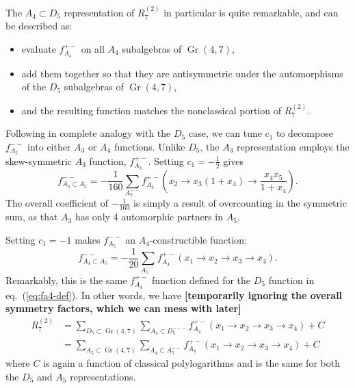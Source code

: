 \documentclass[11pt]{article}
\DeclareMathOperator{\Gr}{Gr}
\def\draftnote#1{{\bf [#1]}}
\begin{document}
The $A_4\subset D_5$ representation of $R^{(2)}_7$ in particular is quite remarkable, and can be described as: 
\begin{itemize}
	\item evaluate $f_{A_4}^{+-}$ on all $A_4$ subalgebras of $\Gr(4,7)$,
	\item add them together so that they are antisymmetric under the automorphisms of the $D_5$ subalgebras of $\Gr(4,7)$,
	\item and the resulting function matches the nonclassical portion of $R^{(2)}_7$.
\end{itemize}
Following in complete analogy with the $D_5$ case, we can tune $c_1$ to decompose $f_{A_5}^{--}$ into either $A_3$ or $A_4$ functions. Unlike $D_5$, the $A_3$ representation employs the skew-symmetric $A_3$ function, $f_{A_3}^{+-}$. Setting $c_1 = -\frac{1}{2}$ gives
\begin{equation}
	f_{A_3\subset A_5}^{--} = -\frac{1}{160}\sum_{A_5^{--}} f_{A_3}^{+-}\left(x_2\to x_3(1+x_4)\to \frac{x_4 x_5}{1+x_4}\right).
\end{equation}
The overall coefficient of $-\frac{1}{160}$ is simply a result of overcounting in the symmetric sum, as that $A_3$ has only 4 automorphic partners in $A_5$.

Setting $c_1 = -1$ makes $f_{A_5}^{--}$ an $A_4$-constructible function:
\begin{equation}
	f_{A_4\subset A_5}^{--} = -\frac{1}{20} \sum_{A_5^{--}} f_{A_4}^{+-}(x_1\to x_2 \to x_3 \to x_4).
\end{equation}
Remarkably, this is the same $f_{A_4}^{+-}$ function defined for the $D_5$ function in eq.~(\ref{eq:fa4-def}). In other words, we have \draftnote{temporarily ignoring the overall symmetry factors, which we can mess with later}
\begin{align}
	R^{(2)}_7 &= \sum_{D_5\subset \Gr(4,7)} \sum_{A_4\subset D_5^{---}} f_{A_4}^{+-}(x_1\to x_2 \to x_3 \to x_4) +C \\
	& = \sum_{A_5\subset \Gr(4,7)} \sum_{A_4\subset A_5^{--}} f_{A_4}^{+-}(x_1\to x_2 \to x_3 \to x_4) + C
\end{align}
where $C$ is again a function of classical polylogarithms and is the same for both the $D_5$ and $A_5$ representations. 
\end{document}
